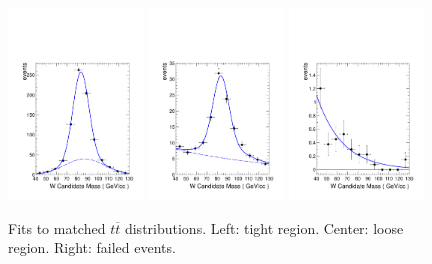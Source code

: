 \begin{figure}[h!]
\centering
                \includegraphics[width=0.32\textwidth]{figs/WtagSF/MT.pdf}
                \includegraphics[width=0.32\textwidth]{figs/WtagSF/ML.pdf}
                \includegraphics[width=0.32\textwidth]{figs/WtagSF/MF.pdf}
\caption{Fits to matched $t\overline{t}$ distributions. Left: tight region. Center: loose region. Right: failed events.}\label{fig:fitsmatched}
\end{figure}

